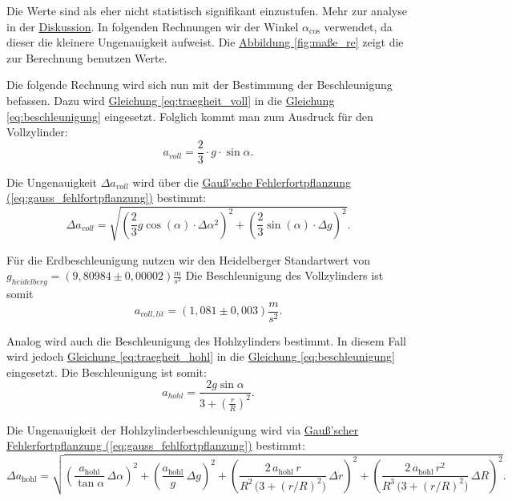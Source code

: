Die Werte sind als eher nicht statistisch signifikant einzustufen. Mehr zur analyse in der \hyperref[ch:diskussion]{Diskussion}. In folgenden Rechnungen wir der Winkel $\alpha_{\cos}$ verwendet, da dieser die kleinere Ungenauigkeit aufweist. Die \hyperref[fig:maße_re]{Abbildung \ref{fig:maße_re}} zeigt die zur Berechnung benutzen Werte.

Die folgende Rechnung wird sich nun mit der Bestimmung der Beschleunigung befassen. Dazu wird \hyperref[eq:traegheit_voll]{Gleichung \ref*{eq:traegheit_voll}} in die \hyperref[eq:beschleunigung]{Gleichung \ref*{eq:beschleunigung}} eingesetzt. Folglich kommt man zum Ausdruck für den Vollzylinder:
\begin{equation}
    a_{voll} = \frac{2}{3} \cdot g \cdot \sin \alpha.
\end{equation}

Die Ungenauigkeit $\Delta a_{voll}$ wird über die \hyperref[eq:gauss_fehlfortpflanzung]{Gauß'sche Fehlerfortpflanzung (\ref*{eq:gauss_fehlfortpflanzung})} bestimmt:
\begin{equation}
    \Delta a_{voll} = \sqrt{\left(\frac{2}{3} g \cos(\alpha) \cdot \Delta \alpha^2\right)^2 + \left(\frac{2}{3}\sin(\alpha) \cdot \Delta g\right)^2}.
\end{equation}

Für die Erdbeschleunigung nutzen wir den Heidelberger Standartwert von $g_{heidelberg} = (9,80984 \pm 0, 00002) \frac{m}{s^2}$ Die Beschleunigung des Vollzylinders ist somit
\begin{equation}
    \boxed{
        a_{voll,lit} = (1,081 \pm 0,003) \frac{m}{s^2}
    }.
    \label{eq:a_v_l}
\end{equation}

Analog wird auch die Beschleunigung des Hohlzylinders bestimmt. In diesem Fall wird jedoch \hyperref[eq:traegheit_hohl]{Gleichung \ref*{eq:traegheit_hohl}} in die \hyperref[eq:beschleunigung]{Gleichung \ref*{eq:beschleunigung}} eingesetzt. Die Beschleunigung ist somit:
\begin{equation}
    a_{hohl} = \frac{2g \sin \alpha}{3+\left(\frac{r}{R}\right)^2}.
    \label{eq:a_h}
\end{equation}

Die Ungenauigkeit der Hohlzylinderbeschleunigung wird via \hyperref[eq:gauss_fehlfortpflanzung]{Gauß'scher Fehlerfortpflanzung (\ref*{eq:gauss_fehlfortpflanzung})} bestimmt:
\begin{equation}
    \Delta a_{\mathrm{hohl}}
    = \sqrt{
    \left( \frac{a_{\mathrm{hohl}}}{\tan\alpha}\,\Delta\alpha \right)^{2}
    + \left( \frac{a_{\mathrm{hohl}}}{g}\,\Delta g \right)^{2}
    + \left( \frac{2\,a_{\mathrm{hohl}}\,r}{R^{2}\,\bigl(3+(r/R)^{2}\bigr)}\,\Delta r \right)^{2}
    + \left( \frac{2\,a_{\mathrm{hohl}}\,r^{2}}{R^{3}\,\bigl(3+(r/R)^{2}\bigr)}\,\Delta R \right)^{2}
    }.
\end{equation}

